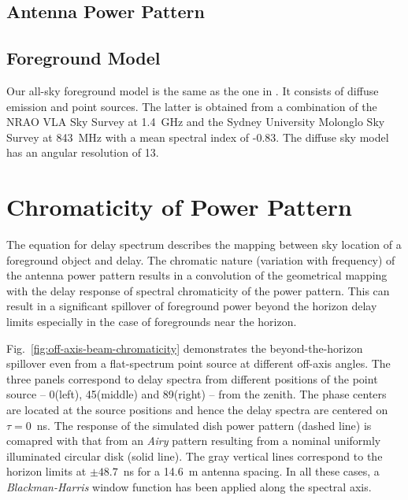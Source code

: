 \documentclass[preprint2,iop,numberedappendix,twocolappendix,appendixfloats]{emulateapj}
\begin{document}
\subsection{Antenna Power Pattern}

\citep{neb15}

\subsection{Foreground Model}\label{sec:foreground}

Our all-sky foreground model is the same as the one in \citet{thy15a}. It consists of diffuse emission \citep{deo08} and point sources. The latter is obtained from a combination of the NRAO VLA Sky Survey \citep[NVSS;][]{con98} at 1.4~GHz and the Sydney University Molonglo Sky Survey \citep[SUMSS;][]{boc99,mau03} at 843~MHz with a mean spectral index of -0.83. The diffuse sky model has an angular resolution of 13.

\section{Chromaticity of Power Pattern}\label{sec:beam-chromaticity}

The equation for delay spectrum describes the mapping between sky location of a foreground object and delay. The chromatic nature (variation with frequency) of the antenna power pattern results in a convolution of the geometrical mapping with the delay response of spectral chromaticity of the power pattern. This can result in a significant spillover of foreground power beyond the horizon delay limits especially in the case of foregrounds near the horizon. 

Fig.~\ref{fig:off-axis-beam-chromaticity} demonstrates the beyond-the-horizon spillover even from a flat-spectrum point source at different off-axis angles. The three panels correspond to delay spectra from different positions of the point source -- 0\arcdeg (left), 45\arcdeg (middle) and 89\arcdeg (right) -- from the zenith. The phase centers are located at the source positions and hence the delay spectra are centered on $\tau = 0$~ns. The response of the simulated dish power pattern (dashed line) is comapred with that from an {\it Airy} pattern resulting from a nominal uniformly illuminated circular disk (solid line). The gray vertical lines correspond to the horizon limits at $\pm 48.7$~ns for a 14.6~m antenna spacing. In all these cases, a {\it Blackman-Harris} window function has been applied along the spectral axis. 
\end{document}
